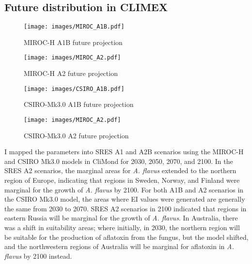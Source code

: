 \subsection{Future distribution in CLIMEX}
\begin{figure*}[!ht]
	\centering
	\texttt{[image: images/MIROC\_A1B.pdf]}
	\caption{MIROC-H A1B future projection}
	\label{fig:MIROC-H A1B future projection}
\end{figure*}

\begin{figure*}[!ht]
	\centering
	\texttt{[image: images/MIROC\_A2.pdf]}
	\caption{MIROC-H A2 future projection}
	\label{fig:MIROC-H A2 future projection}
\end{figure*}
\pagebreak
\begin{figure*}[!ht]
	\centering
	\texttt{[image: images/CSIRO\_A1B.pdf]}
	\caption{CSIRO-Mk3.0 A1B future projection}
	\label{fig:CSIRO-Mk3.0 A1B future projection}
\end{figure*}

\begin{figure*}[!ht]
	\centering
	\texttt{[image: images/MIROC\_A2.pdf]}
	\caption{CSIRO-Mk3.0 A2 future projection}
	\label{fig:CSIRO-Mk3.0 A2 future projection}
\end{figure*}
\pagebreak
I mapped the parameters into SRES A1 and A2B scenarios using the MIROC-H and CSIRO Mk3.0 models in CliMond \citep{kriticos2012climond} for 2030, 2050, 2070, and 2100. In the SRES A2 scenarios, the marginal areas for \textit{A. flavus} extended to the northern region of Europe, indicating that regions in Sweden, Norway, and Finland were marginal for the growth of \textit{A. flavus} by 2100. For both A1B and A2 scenarios in the CSIRO Mk3.0 model, the areas where EI values were generated are generally the same from 2030 to 2070. SRES A2 scenarios in 2100 indicated that regions in eastern Russia will be marginal for the growth of \textit{A. flavus}. In Australia, there was a shift in suitability areas; where initially, in 2030, the northern region will be suitable for the production of aflatoxin from the fungus, but the model shifted, and the northwestern regions of Australia will be marginal for aflatoxin in \textit{A. flavus} by 2100 instead.